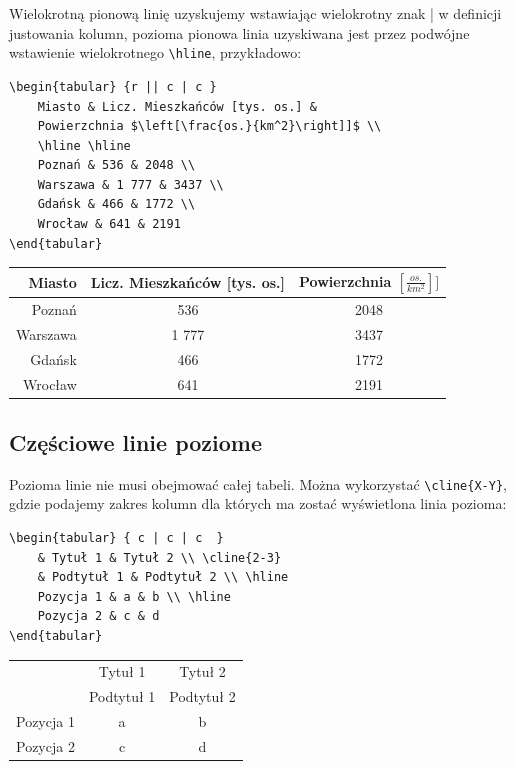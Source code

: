 \documentclass[10pt,a4paper]{article}
\begin{document}
Wielokrotną pionową linię uzyskujemy wstawiając wielokrotny znak \lstinline||| w definicji justowania kolumn, pozioma pionowa linia uzyskiwana jest przez podwójne wstawienie wielokrotnego \lstinline|\hline|, przykładowo:

\begin{lstlisting}
\begin{tabular} {r || c | c }
	Miasto & Licz. Mieszkańców [tys. os.] & 
	Powierzchnia $\left[\frac{os.}{km^2}\right]]$ \\ 
	\hline \hline
	Poznań & 536 & 2048 \\
	Warszawa & 1 777 & 3437 \\
	Gdańsk & 466 & 1772 \\
	Wrocław & 641 & 2191
\end{tabular}
\end{lstlisting}

\begin{tabular} {r || c | c }
	Miasto & Licz. Mieszkańców [tys. os.] & 
	Powierzchnia $\left[\frac{os.}{km^2}\right]]$ \\ \hline \hline
	Poznań & 536 & 2048 \\
	Warszawa & 1 777 & 3437 \\
	Gdańsk & 466 & 1772 \\
	Wrocław & 641 & 2191
\end{tabular}

\subsection{Częściowe linie poziome}

Pozioma linie nie musi obejmować całej tabeli. Można wykorzystać \lstinline|\cline{X-Y}|, gdzie podajemy zakres kolumn dla których ma zostać wyświetlona linia pozioma:

\begin{lstlisting}
\begin{tabular} { c | c | c  }
	& Tytuł 1 & Tytuł 2 \\ \cline{2-3}
	& Podtytuł 1 & Podtytuł 2 \\ \hline
	Pozycja 1 & a & b \\ \hline
	Pozycja 2 & c & d
\end{tabular}
\end{lstlisting}

\begin{tabular} { c | c | c  }
	& Tytuł 1 & Tytuł 2 \\ \cline{2-3}
	& Podtytuł 1 & Podtytuł 2 \\ \hline
	Pozycja 1 & a & b \\ \hline
	Pozycja 2 & c & d
\end{tabular}
\end{document}
